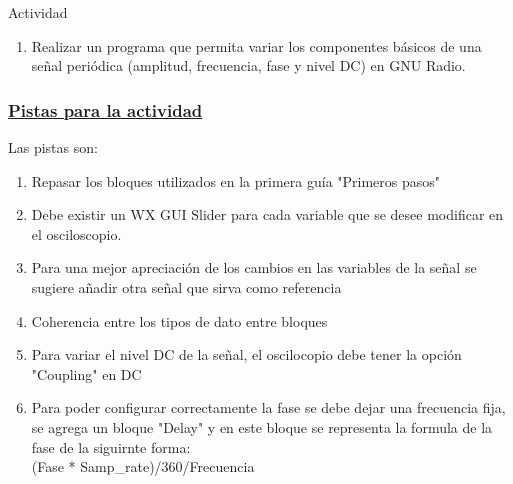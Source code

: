 \begin{frame}{Actividad}
	\begin{enumerate}[1.]
		
		\item{Realizar un programa que permita variar los componentes básicos de una señal periódica (amplitud, frecuencia, fase y nivel DC) en GNU Radio.}\\
		
	\end{enumerate}
\end{frame}

\begin{frame}
	
	\frametitle{\underline{\textbf{Pistas para la actividad}}}
	
	Las pistas son:
	\begin{enumerate}[1.]
		
		\item {Repasar los bloques utilizados en la primera guía "Primeros pasos"}\\
		\item {Debe existir un WX GUI Slider para cada variable que se desee modificar en el osciloscopio.}\\
		\item {Para una mejor apreciación  de los cambios en las variables de la señal se sugiere añadir otra señal que sirva como referencia}\\
		\item {Coherencia entre los tipos de dato entre bloques}\\
		\item {Para variar el nivel DC de la señal, el oscilocopio debe tener la opción "Coupling" en DC}\\
		\item {Para poder configurar correctamente la fase se debe dejar una frecuencia fija, se agrega un bloque "Delay" y en este bloque se representa la formula de la fase de la siguirnte forma: \\
(Fase * Samp\_rate)/360/Frecuencia }
	\end{enumerate}
\end{frame}
